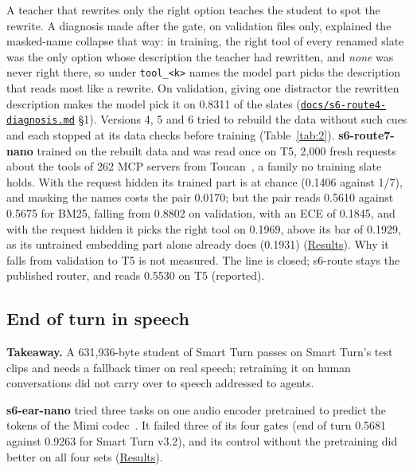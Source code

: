 \documentclass[10pt]{article}
\begin{document}
A teacher that rewrites only the right option teaches the student to spot the rewrite. A diagnosis made after the gate, on validation files only, explained the masked-name collapse that way: in training, the right tool of every renamed slate was the only option whose description the teacher had rewritten, and \emph{none} was never right there, so under \texttt{tool\_\allowbreak{}<k>} names the model part picks the description that reads most like a rewrite. On validation, giving one distractor the rewritten description makes the model pick it on 0.8311 of the slates (\href{https://github.com/maxgfr/skycmd/blob/main/docs/s6-route4-diagnosis.md}{\texttt{docs/\allowbreak{}s6-route4-diagnosis.md}} \S{}1). Versions 4, 5 and 6 tried to rebuild the data without such cues and each stopped at its data checks before training (Table~\ref{tab:2}). \textbf{s6-route7-nano} trained on the rebuilt data and was read once on T5, 2,000 fresh requests about the tools of 262 MCP servers from Toucan~\cite{toucan}, a family no training slate holds. With the request hidden its trained part is at chance (0.1406 against 1/7), and masking the names costs the pair 0.0170; but the pair reads 0.5610 against 0.5675 for BM25, falling from 0.8802 on validation, with an ECE of 0.1845, and with the request hidden it picks the right tool on 0.1969, above its bar of 0.1929, as its untrained embedding part alone already does (0.1931) (\href{https://maxgfr.github.io/skycmd/results/\#s6-route7-nano-failed}{Results}). Why it falls from validation to T5 is not measured. The line is closed; s6-route stays the published router, and reads 0.5530 on T5 (reported).

\subsection{End of turn in speech}\label{sec:6.4}

\textbf{Takeaway.} A 631,936-byte student of Smart Turn passes on Smart Turn's test clips and needs a fallback timer on real speech; retraining it on human conversations did not carry over to speech addressed to agents.

\textbf{s6-ear-nano} tried three tasks on one audio encoder pretrained to predict the tokens of the Mimi codec~\cite{defossez2024moshi}. It failed three of its four gates (end of turn 0.5681 against 0.9263 for Smart Turn v3.2), and its control without the pretraining did better on all four sets (\href{https://maxgfr.github.io/skycmd/results/\#s6-ear-nano-failed}{Results}).
\end{document}
